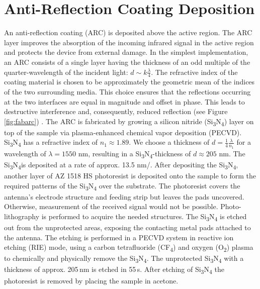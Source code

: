 \section{Anti-Reflection Coating Deposition}

An anti-reflection coating (ARC) is deposited above the active region. The ARC layer improves the absorption of the incoming infrared signal in the active region  \cite{chenAntireflectionImplementationsTerahertz2014} and protects the device from external damage. In the simplest implementation, an ARC consists of a single layer having the thickness of an odd multiple of the quarter-wavelength of the incident light: $d \sim k \frac{\lambda}{4}$. The refractive index of the coating material is chosen to be approximately the geometric mean of the indices of the two surrounding media. This choice ensures that the reflections occurring at the two interfaces are equal in magnitude and offset in phase. This leads to destructive interference and, consequently, reduced reflection (see Figure \ref{fig:fabarc}) \cite{paschottaAntireflectionCoatings2005}. 
The ARC is fabricated by growing a silicon nitride (Si\textsubscript{3}N\textsubscript{4}) layer on top of the sample via plasma-enhanced chemical vapor deposition (PECVD). Si\textsubscript{3}N\textsubscript{4} has a refractive index of $n_1 \approx 1.89$. We choose a thickness of $d = \frac{1}{4} \frac{\lambda}{n_1}$ for a wavelength of $\lambda = 1550$ \si{\nano \meter}, resulting  in a Si\textsubscript{3}N\textsubscript{4}-thickness of $d \approx 205$ \si{\nano \meter}. The Si\textsubscript{3}N\textsubscript{4}is deposited at a rate of approx. \num{13.5} \si{\nano \meter/\min}. After depositing the Si\textsubscript{3}N\textsubscript{4}, another layer of AZ 1518 HS photoresist is deposited onto the sample to form the required patterns of the Si\textsubscript{3}N\textsubscript{4} over the substrate. The photoresist covers the antenna’s electrode structure and feeding strip but leaves the pads uncovered. Otherwise, measurement of the received signal would not be possible. Photo-lithography is performed to acquire the needed structures. The Si\textsubscript{3}N\textsubscript{4} is etched out from the unprotected areas, exposing the contacting metal pads attached to the antenna. The etching is performed in a PECVD system in reactive ion etching (RIE) mode, using a carbon tetrafluoride (CF\textsubscript{4}) and oxygen (O\textsubscript{2}) plasma to chemically and physically remove the Si\textsubscript{3}N\textsubscript{4}. The unprotected Si\textsubscript{3}N\textsubscript{4} with a thickness of approx. \num{205}\,\si{\nano \meter} is etched in \num{55}\,\si{\s}. After etching of Si\textsubscript{3}N\textsubscript{4} the photoresist is removed by placing the sample in acetone.

